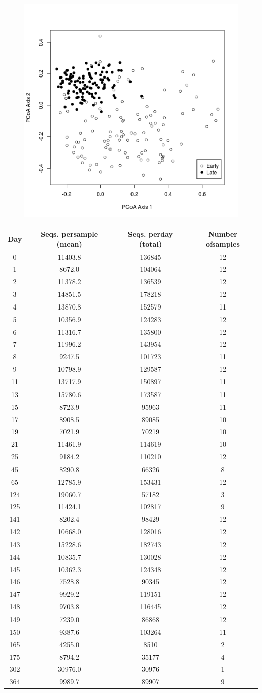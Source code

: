 \documentclass[11pt,]{article}
\begin{document}
\begin{figure}[htbp]
\centering
\includegraphics{../results/figures/nmds_figure.png}
\caption{}
\end{figure}

\begin{longtable}[c]{@{}cccc@{}}
\toprule
Day & Seqs. persample (mean) & Seqs. perday (total) & Number
ofsamples\tabularnewline
\midrule
\endhead
0 & 11403.8 & 136845 & 12\tabularnewline
1 & 8672.0 & 104064 & 12\tabularnewline
2 & 11378.2 & 136539 & 12\tabularnewline
3 & 14851.5 & 178218 & 12\tabularnewline
4 & 13870.8 & 152579 & 11\tabularnewline
5 & 10356.9 & 124283 & 12\tabularnewline
6 & 11316.7 & 135800 & 12\tabularnewline
7 & 11996.2 & 143954 & 12\tabularnewline
8 & 9247.5 & 101723 & 11\tabularnewline
9 & 10798.9 & 129587 & 12\tabularnewline
11 & 13717.9 & 150897 & 11\tabularnewline
13 & 15780.6 & 173587 & 11\tabularnewline
15 & 8723.9 & 95963 & 11\tabularnewline
17 & 8908.5 & 89085 & 10\tabularnewline
19 & 7021.9 & 70219 & 10\tabularnewline
21 & 11461.9 & 114619 & 10\tabularnewline
25 & 9184.2 & 110210 & 12\tabularnewline
45 & 8290.8 & 66326 & 8\tabularnewline
65 & 12785.9 & 153431 & 12\tabularnewline
124 & 19060.7 & 57182 & 3\tabularnewline
125 & 11424.1 & 102817 & 9\tabularnewline
141 & 8202.4 & 98429 & 12\tabularnewline
142 & 10668.0 & 128016 & 12\tabularnewline
143 & 15228.6 & 182743 & 12\tabularnewline
144 & 10835.7 & 130028 & 12\tabularnewline
145 & 10362.3 & 124348 & 12\tabularnewline
146 & 7528.8 & 90345 & 12\tabularnewline
147 & 9929.2 & 119151 & 12\tabularnewline
148 & 9703.8 & 116445 & 12\tabularnewline
149 & 7239.0 & 86868 & 12\tabularnewline
150 & 9387.6 & 103264 & 11\tabularnewline
165 & 4255.0 & 8510 & 2\tabularnewline
175 & 8794.2 & 35177 & 4\tabularnewline
302 & 30976.0 & 30976 & 1\tabularnewline
364 & 9989.7 & 89907 & 9\tabularnewline
\bottomrule
\end{longtable}
\end{document}
